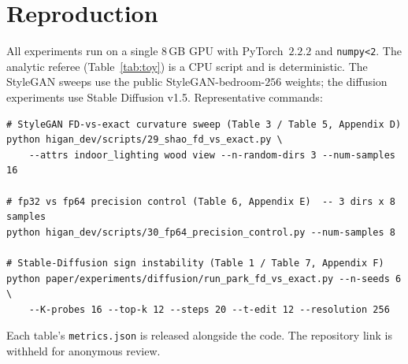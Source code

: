 \documentclass[10pt]{article} %
\begin{document}
\section{Reproduction}
\label{app:repro}
All experiments run on a single $8$\,GB GPU with PyTorch~$2.2.2$ and
\texttt{numpy<2}. The analytic referee (Table~\ref{tab:toy}) is a CPU script and
is deterministic. The StyleGAN sweeps use the public StyleGAN-bedroom-$256$
weights; the diffusion experiments use Stable Diffusion v1.5. Representative
commands:
\begin{verbatim}
# StyleGAN FD-vs-exact curvature sweep (Table 3 / Table 5, Appendix D)
python higan_dev/scripts/29_shao_fd_vs_exact.py \
    --attrs indoor_lighting wood view --n-random-dirs 3 --num-samples 16

# fp32 vs fp64 precision control (Table 6, Appendix E)  -- 3 dirs x 8 samples
python higan_dev/scripts/30_fp64_precision_control.py --num-samples 8

# Stable-Diffusion sign instability (Table 1 / Table 7, Appendix F)
python paper/experiments/diffusion/run_park_fd_vs_exact.py --n-seeds 6 \
    --K-probes 16 --top-k 12 --steps 20 --t-edit 12 --resolution 256
\end{verbatim}
Each table's \texttt{metrics.json} is released alongside the code. The repository
link is withheld for anonymous review.
\end{document}
